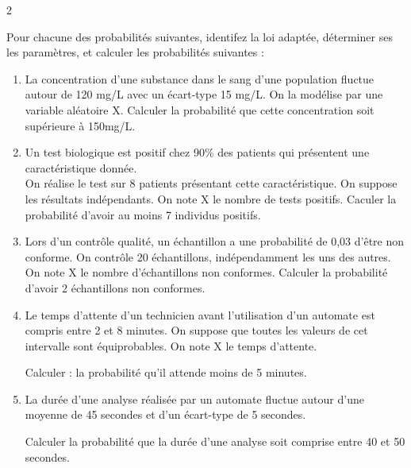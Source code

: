 \documentclass[10pt,a4paper]{article}
\begin{document}
\begin{multicols}{2}
\begin{exo}
    Pour chacune des probabilités suivantes, identifez la loi adaptée, déterminer ses les paramètres, et calculer les probabilités suivantes :\begin{enumerate}
        \item La concentration d'une substance dans le sang d'une population fluctue autour de 120 mg/L avec un écart-type 15 mg/L. On la modélise par une variable aléatoire X. Calculer la probabilité que cette concentration soit supérieure à 150mg/L.
        \item Un test biologique est positif chez 90\% des patients qui présentent une caractéristique donnée. \\
        On réalise le test sur 8 patients présentant cette caractéristique. On suppose les résultats indépendants. On note X le nombre de tests positifs. Caculer la probabilité d'avoir au moins 7 individus positifs.
        \item Lors d'un contrôle qualité, un échantillon a une probabilité de 0,03 d'être non conforme. On contrôle 20 échantillons, indépendamment les uns des autres. On note X le nombre d'échantillons non conformes. Calculer la probabilité d'avoir 2 échantillons non conformes.
        \item Le temps d'attente d'un technicien avant l'utilisation d'un automate est compris entre 2 et 8 minutes. On suppose que toutes les valeurs de cet intervalle sont équiprobables. On note X le temps d'attente.

        Calculer : la probabilité qu'il attende moins de 5 minutes.
        \item La durée d'une analyse réalisée par un automate fluctue autour d'une moyenne de 45 secondes et d'un écart-type de 5 secondes.

        Calculer la probabilité que la durée d'une analyse soit comprise entre 40 et 50 secondes.
    \end{enumerate}
\end{exo}
\end{multicols}
\end{document}

